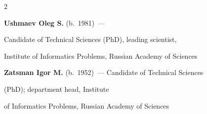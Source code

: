\begin{multicols}{2}



















\vspace*{10pt}













\noindent %


\textbf{Ushmaev Oleg S.} (b.\ 1981)~---


Candidate of Technical Sciences (PhD), leading scientist,


Institute of Informatics Problems,  Russian Academy of Sciences





\vspace*{10pt}





\noindent


\textbf{Zatsman Igor M.} (b.\ 1952)~--- Candidate of Technical Sciences


(PhD); department head, Institute


of Informatics Problems, Russian Academy of Sciences




















\end{multicols}


